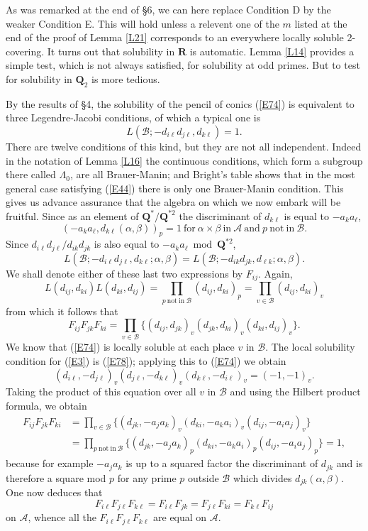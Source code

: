 \documentclass[12pt]{article}
\def\bQ{{\mathbf Q}}
\def\bR{{\mathbf R}}
\def\ga{{\alpha}}
\def\gb{{\beta}}
\def\gL{{\Lambda}}
\def\sA{{\mathcal A}}
\def\sB{{\mathcal B}}
\def\beq{\begin{equation} \label}
\begin{document}
As was remarked at the end of \S6, we can here replace
Condition D by the weaker Condition E. This will hold unless
a relevent one of the $m$ listed at the end of the proof of
Lemma \ref{L21} corresponds to an everywhere locally soluble
2-covering. It turns out that solubility in $\bR$ is automatic.
Lemma \ref{L14} provides a simple test, which is not always
satisfied, for solubility at odd primes. But to test for
solubility in $\bQ_2$ is more tedious.

By the results of \S4, the solubility of the pencil of conics
(\ref{E74})
is equivalent to three Legendre-Jacobi conditions, of which a
typical one is
\beq{E77} L(\sB;-d_{i\ell}d_{j\ell},d_{k\ell})=1.
\end{equation}
There are twelve conditions of this kind, but they are not all
independent. Indeed in the notation of Lemma \ref{L16} the
continuous conditions, which form a subgroup there called
$\gL_0$, are all Brauer-Manin; and Bright's table shows that
in the most general case satisfying (\ref{E44}) there is only
one Brauer-Manin condition. This gives us advance assurance
that the algebra on which we now embark will be fruitful.
Since as an element of
$\bQ^*/\bQ^{*2}$ the discriminant of $d_{k\ell}$ is equal to
$-a_ka_\ell$,
\[ (-a_ka_\ell,d_{k\ell}(\ga,\gb))_p=1 \mathrm{~for~}
\ga\times\gb \mathrm{~in~} \sA \mathrm{~and~} p
\mathrm{~not~in~} \sB. \]
Since $d_{i\ell}d_{j\ell}/d_{ik}d_{jk}$ is also equal to
$-a_ka_\ell\bmod\bQ^{*2}$,
\[ L(\sB;-d_{i\ell}d_{j\ell},d_{k\ell};\ga,\gb)=
L(\sB;-d_{ik}d_{jk},d_{\ell k};\ga,\gb). \]
We shall denote either of these last two expressions by
$F_{ij}$. Again,
\[ L(d_{ij},d_{ki})L(d_{ki},d_{ij})=\prod_{p \mathrm{~not~in~}
\sB}(d_{ij},d_{ki})_p=\prod_{v\in\sB}(d_{ij},d_{ki})_v \]
from which it follows that
\[ F_{ij}F_{jk}F_{ki}=\prod_{v\in\sB}\{(d_{ij},d_{jk})_v
(d_{jk},d_{ki})_v(d_{ki},d_{ij})_v\}. \]
We know that (\ref{E74}) is locally soluble at each place $v$
in $\sB$. The local solubility condition for (\ref{E3}) is
(\ref{E78}); applying this to (\ref{E74}) we obtain
\[ (d_{i\ell},-d_{j\ell})_v(d_{j\ell},-d_{k\ell})_v
(d_{k\ell},-d_{i\ell})_v=(-1,-1)_v. \]
Taking the product of this equation over all $v$ in $\sB$ and
using the Hilbert product formula, we obtain
\begin{align*}
F_{ij}F_{jk}F_{ki} & =\prod_{v\in\sB}\{(d_{jk},-a_ja_k)_v
(d_{ki},-a_ka_i)_v(d_{ij},-a_ia_j)_v\} \\
 & =\prod_{p\mathrm{~not~in~}\sB}\{(d_{jk},-a_ja_k)_p
(d_{ki},-a_ka_i)_p(d_{ij},-a_ia_j)_p\}=1,
\end{align*}
because for example $-a_ja_k$ is up to a squared factor the
discriminant of $d_{jk}$ and is therefore a square mod $p$
for any prime $p$ outside $\sB$ which divides
$d_{jk}(\ga,\gb)$. One now deduces that
\[ F_{i\ell}F_{j\ell}F_{k\ell}=F_{i\ell}F_{jk}=F_{j\ell}
F_{ki}=F_{k\ell}F_{ij} \]
on $\sA$, whence all the $F_{i\ell}F_{j\ell}F_{k\ell}$ are
equal on $\sA$.
\end{document}
